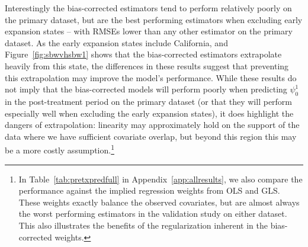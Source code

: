 \documentclass[aoas]{imsart}
\theoremstyle{plain}
\theoremstyle{remark}
\begin{document}
Interestingly the bias-corrected estimators tend to perform relatively poorly on the primary dataset, but are the best performing estimators when excluding early expansion states -- with RMSEs lower than any other estimator on the primary dataset. As the early expansion states include California, and Figure~\ref{fig:sbwvhsbw1} shows that the bias-corrected estimators extrapolate heavily from this state, the differences in these results suggest that preventing this extrapolation may improve the model's performance. While these results do not imply that the bias-corrected models will perform poorly when predicting $\psi^1_0$ in the post-treatment period on the primary dataset (or that they will perform especially well when excluding the early expansion states), it does highlight the dangers of extrapolation: linearity may approximately hold on the support of the data where we have sufficient covariate overlap, but beyond this region this may be a more costly assumption.\footnote{In Table~\ref{tab:pretxpredfull} in Appendix~\ref{app:allresults}, we also compare the performance against the implied regression weights from OLS and GLS. These weights exactly balance the observed covariates, but are almost always the worst performing estimators in the validation study on either dataset. This also illustrates the benefits of the regularization inherent in the bias-corrected weights.}

\end{document}
